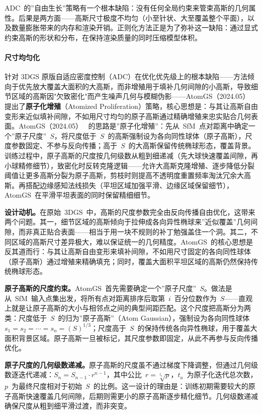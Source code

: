 ADC~的”自由生长”策略有一个根本缺陷：没有任何全局约束来管束高斯的几何属性。后果是两方面——高斯尺寸极度不均匀（小至针状、大至覆盖整个平面），以及数量膨胀带来的内存和渲染开销。正则化方法正是为了弥补这一缺陷：通过显式约束高斯的形状和分布，在保持渲染质量的同时压缩模型体积。

\paragraph{尺寸均匀化}

针对 3DGS 原版自适应密度控制（ADC）在优化优先级上的根本缺陷——方法倾向于优先放大覆盖大面积的大高斯，而非增殖用于填补几何间隙的小高斯，导致细节区域的高斯因"欠致密化"而产生噪声几何与模糊伪影——AtomGS（2024.05）~\cite{2405_12369} 提出了\textbf{原子化增殖}（Atomized Proliferation）策略，核心思想是：与其让高斯自由变形来近似填补间隙，不如用尺寸均匀的原子高斯通过精确增殖来忠实贴合几何表面。AtomGS（2024.05）~\cite{2405_12369} 的思路是”原子化增殖”：先从~SfM~点对距离中确定一个”原子尺度”~$S$，将尺度低于~$S$~的高斯强制设为各向同性球体（原子高斯），尺度参数固定、不参与反向传播；高于~$S$~的大高斯保留传统椭球形态，覆盖背景。训练过程中，原子高斯的尺度按几何级数从粗到细递减（先大球快速覆盖间隙，再小球精修细节），致密化时反转克隆逻辑——允许大高斯克隆增殖、逐步降低分裂阈值让更多高斯分裂为原子高斯，剪枝时则提高不透明度重置频率淘汰冗余大高斯。再搭配边缘感知法线损失（平坦区域加强平滑、边缘区域保留细节），AtomGS~在平滑平坦表面的同时保留精细细节。

\textbf{设计动机。}在原始~3DGS~中，高斯的尺度参数完全由反向传播自由优化，这带来两个问题。其一，细节区域的高斯倾向于拉伸成各向异性椭球来”近似覆盖”几何间隙，而非真正贴合表面——相当于用一块不规则的补丁勉强盖住一个洞。其二，不同区域的高斯尺寸差异极大，难以保证统一的几何精度。AtomGS~的核心思想是反其道而行：与其让高斯自由变形来填补间隙，不如用尺寸固定的各向同性球体（原子高斯）通过增殖来精确填充；同时，覆盖大面积平坦区域的高斯仍然保持传统椭球形态。

\textbf{原子高斯的尺度约束。}AtomGS~首先需要确定一个”原子尺度”~$S$。做法是从~SfM~输入点集出发，将所有点对距离排序后取第~$i$~百分位数作为~$S$——直观上就是让原子高斯的大小与相邻点之间的典型间距匹配。这个尺度把高斯分为两类：尺度低于~$S$~的归为”原子高斯”（Atom Gaussian），强制设为各向同性球体~$s_1 = s_2 = \cdots = s_n = (S)^{1/3}$；尺度高于~$S$~的保持传统各向异性椭球，用于覆盖大面积背景区域。原子高斯一旦被标记，其尺度参数即固定，从此不再参与反向传播优化。

\textbf{原子尺度的几何级数递减。}原子高斯的尺度虽不通过梯度下降调整，但通过几何级数逐迭代递减：$S_n = S_{n-1} \cdot r^{n-1}$，其中公比~$r = \sqrt[t_a]{p}$，$t_a$~为原子化迭代总次数，$p$~为最终尺度相对于初始~$S$~的比例。这一设计的理由是：训练初期需要较大的原子高斯快速覆盖几何间隙，后期则需更小的原子高斯逐步精化细节。几何级数递减确保尺度从粗到细平滑过渡，而非突变。

